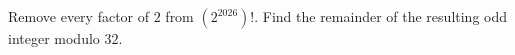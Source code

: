 Remove every factor of $2$ from $(2^{2026})!$. Find the remainder of the resulting odd integer modulo $32$.
